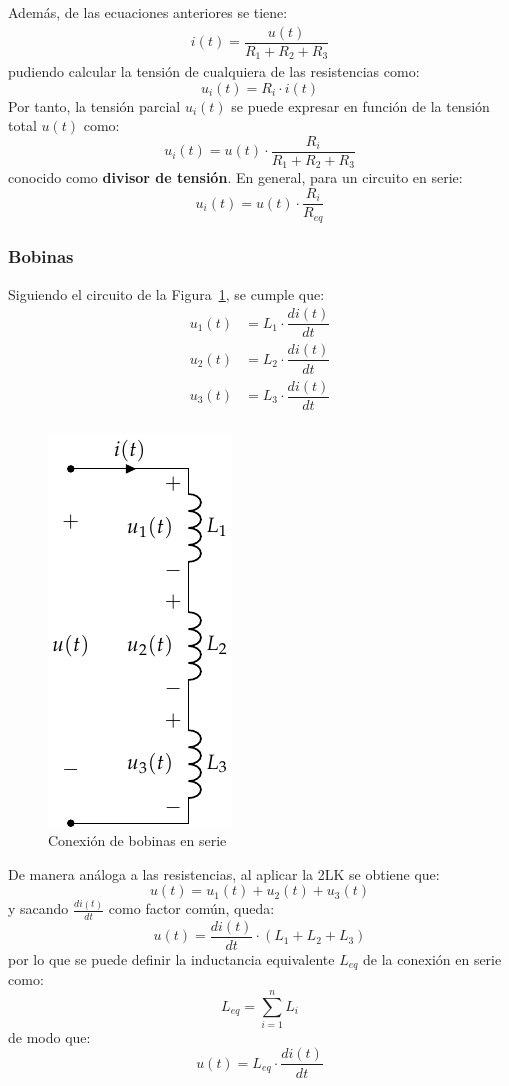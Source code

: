 		Además, de las ecuaciones anteriores se tiene:
		\begin{align*}
			i(t) = \dfrac{u(t)}{R_1 + R_2 + R_3}
		\end{align*}
		pudiendo calcular la tensión de cualquiera de las resistencias como: 
		\begin{equation*}
			u_i(t) = R_i \cdot i(t)
		\end{equation*}
		Por tanto, la tensión parcial $u_i(t)$ se puede expresar en función de la tensión total $u(t)$ como: 
		\begin{equation*}
			u_i(t) = u(t) \cdot \frac{R_i}{R_1 + R_2 + R_3}
		\end{equation*}
		conocido como \textbf{divisor de tensión}. En general, para un circuito en serie:
		\begin{equation}
			\boxed{u_i(t) = u(t) \cdot \frac{R_i}{R_{eq}}}
		\end{equation}
		\subsubsection{Bobinas}
		Siguiendo el circuito de la Figura~\ref{fig.bobinas-serie}, se cumple que:
		\begin{align*}
			u_1(t) &= L_1 \cdot \dfrac{di(t)}{dt}\\
			u_2(t) &= L_2 \cdot \dfrac{di(t)}{dt}\\
			u_3(t) &= L_3 \cdot \dfrac{di(t)}{dt}\\
		\end{align*}
		\begin{figure}[H]
			\centering
			\includegraphics[width=0.2\linewidth]{../figs/BobinasSerie.pdf}
			\caption{Conexión de bobinas en serie}
			\label{fig.bobinas-serie}
		\end{figure}
		De manera análoga a las resistencias, al aplicar la 2LK se obtiene que: 
		\begin{equation*}
			u(t) = u_1(t) + u_2(t) + u_3(t)
		\end{equation*}
		y sacando $\frac{di(t)}{dt}$ como factor común, queda:
		\begin{equation*}
			u(t) = \dfrac{di(t)}{dt} \cdot (L_1 + L_2 + L_3)
		\end{equation*}
		por lo que se puede definir la inductancia equivalente $L_{eq}$ de la conexión en serie como:
		\begin{equation}
			\boxed{L_{eq} = \sum_{i = 1}^n L_i}
		\end{equation}
		de modo que:
		\begin{equation*}
			u(t) = L_{eq} \cdot \dfrac{di(t)}{dt}
		\end{equation*}
